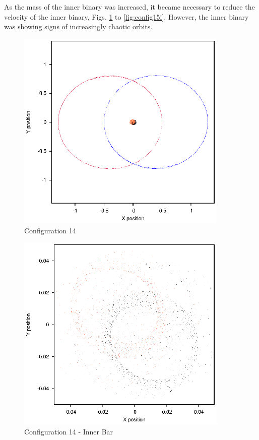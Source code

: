 \documentclass[a4paper,12pt]{article}
\begin{document}
As the mass of the inner binary was increased, it became necessary to reduce the velocity of the inner binary, Figs. \ref{fig:config14} to \ref{fig:config15i}.
However, the inner binary was showing signs of increasingly chaotic orbits.
\begin{figure}[H]
\centering
\includegraphics[width=0.9\textwidth]{./2017results/035-75-04-4/Orbit.eps}
\caption{Configuration 14}
\label{fig:config14}
\end{figure}
\begin{figure}[H]
\centering
\includegraphics[width=0.9\textwidth]{./2017results/035-75-04-4/Inner.eps}
\caption{Configuration 14 - Inner Bar}
\label{fig:config14i}
\end{figure}
\end{document}
